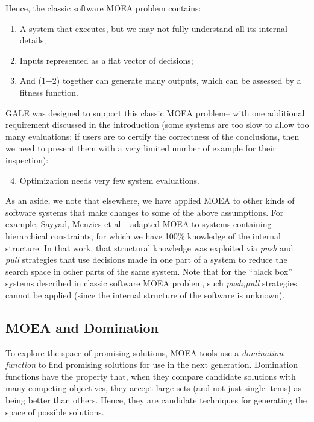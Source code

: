 \documentclass[10pt,journal,compsoc]{IEEEtran}
\newcommand{\be}{\begin{enumerate}}
\newcommand{\ee}{\end{enumerate}}
\newenvironment{changed}{\par\color{MyDarkBlue}}{\par}
\begin{document}
\begin{changed}
Hence, the classic software MOEA 
problem contains:\be
\item
 A system that executes, but we may not fully understand all its internal details;
\item
Inputs represented as a flat vector of decisions;
\item And (1+2) together can 
generate many outputs, which can be assessed by a
fitness function.
\ee
GALE was designed to support this
classic MOEA problem-- with one additional requirement
discussed in the introduction (some systems are too
slow to allow too many evaluations; if users are to certify the correctness of the conclusions, then
we need to present them with a very limited number of example for their inspection):
\begin{enumerate}
\setcounter{enumi}{3}
\item Optimization needs very few system evaluations.
\end{enumerate}
As an aside, we note that elsewhere, we have applied MOEA to other kinds of software systems that make changes
to some of the above assumptions. For example, Sayyad, Menzies et al.~\cite{sayyad13a,sayyad13b} 
adapted
MOEA to systems containing hierarchical  constraints, for which we
have  100\% knowledge of the internal structure.
In that work, that structural knowledge was exploited via {\em push} and {\em pull} strategies
that use decisions made in
one part of a system to reduce the search space in
other parts of the same system. Note that for the ``black box'' systems described in classic
software MOEA problem, such {\em push,pull} strategies cannot be applied (since the internal
structure of the software is unknown).
\end{changed}
\subsection{MOEA and Domination}\label{sec:cdom}


To explore the space of promising solutions,
MOEA tools
use a
{\em  domination function} to
find
promising solutions for use in the next generation. 
Domination functions have the property
that, when they compare candidate solutions with many competing objectives,
they accept large sets (and not just single items) as being better than others.
Hence, they are candidate techniques for generating the space of possible solutions.
\end{document}
